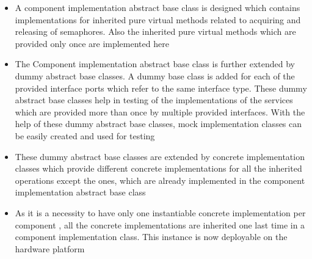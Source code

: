 \begin{itemize}
\item A component implementation abstract base class is designed which contains implementations for inherited pure virtual methods related to acquiring and releasing of semaphores. Also the inherited pure virtual methods which are provided only once are implemented here
\item The Component implementation abstract base class is further extended by dummy abstract base classes. A dummy base class is added for each of the provided interface ports which refer to the same interface type. These dummy abstract base classes help in testing of the implementations of the services which are provided more than once by multiple provided interfaces. With the help of these dummy abstract base classes, mock implementation classes can be easily created and used for testing \cite{InvOfCntrlurl}  
\item These dummy abstract base classes are extended by concrete implementation classes which provide different concrete implementations for all the inherited operations except the ones, which are already implemented in the component implementation abstract base class
\item As it is a necessity to have only one instantiable concrete implementation per component \cite{EvoRAVCodeAr}\cite{SpecMetamodel}\cite{CompBasedProcess}, all the concrete implementations are inherited one last time in a component implementation class. This instance is now deployable on the hardware platform
\end{itemize}
 
